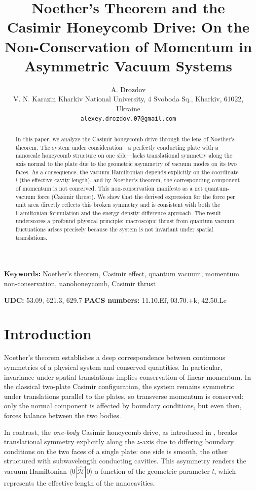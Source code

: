 \documentclass[10pt]{article}
\title{Noether's Theorem and the Casimir Honeycomb Drive: On the Non-Conservation of Momentum in Asymmetric Vacuum Systems}
\author{A. Drozdov\\
V. N. Karazin Kharkiv National University, 4 Svoboda Sq., Kharkiv, 61022, Ukraine\\
\texttt{alexey.drozdov.07@gmail.com}}
\date{}
\begin{document}
\maketitle

\begin{abstract}
In this paper, we analyze the Casimir honeycomb drive through the lens of Noether’s theorem. The system under consideration—a perfectly conducting plate with a nanoscale honeycomb structure on one side—lacks translational symmetry along the axis normal to the plate due to the geometric asymmetry of vacuum modes on its two faces. As a consequence, the vacuum Hamiltonian depends explicitly on the coordinate $l$ (the effective cavity length), and by Noether’s theorem, the corresponding component of momentum is not conserved. This non-conservation manifests as a net quantum-vacuum force (Casimir thrust). We show that the derived expression for the force per unit area directly reflects this broken symmetry and is consistent with both the Hamiltonian formulation and the energy-density difference approach. The result underscores a profound physical principle: macroscopic thrust from quantum vacuum fluctuations arises precisely because the system is not invariant under spatial translations.
\end{abstract}

\medskip
\noindent\textbf{Keywords:} Noether’s theorem, Casimir effect, quantum vacuum, momentum non-conservation, nanohoneycomb, Casimir thrust

\medskip
\noindent\textbf{UDC:} 53.09, 621.3, 629.7 \quad
\textbf{PACS numbers:} 11.10.Ef, 03.70.+k, 42.50.Lc

\section{Introduction}
Noether’s theorem establishes a deep correspondence between continuous symmetries of a physical system and conserved quantities. In particular, invariance under spatial translations implies conservation of linear momentum. In the classical two-plate Casimir configuration, the system remains symmetric under translations parallel to the plates, so transverse momentum is conserved; only the normal component is affected by boundary conditions, but even then, forces balance between the two bodies.

In contrast, the \textit{one-body} Casimir honeycomb drive, as introduced in \cite{Drozdov2024}, breaks translational symmetry explicitly along the $z$-axis due to differing boundary conditions on the two faces of a single plate: one side is smooth, the other structured with subwavelength conducting cavities. This asymmetry renders the vacuum Hamiltonian $\langle 0|\hat{\mathcal{H}}|0\rangle$ a function of the geometric parameter $l$, which represents the effective length of the nanocavities.
\end{document}
